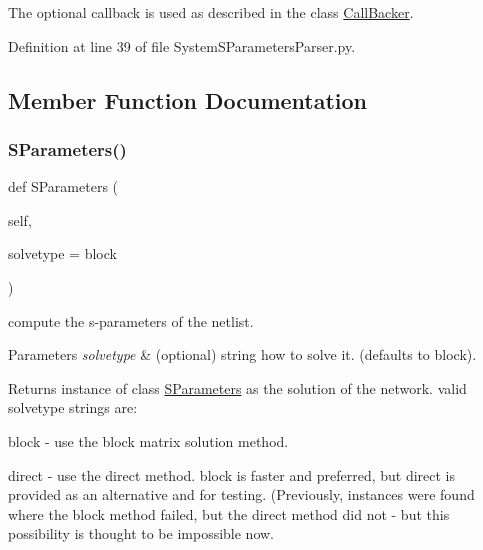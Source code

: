 The optional callback is used as described in the class \hyperlink{namespaceSignalIntegrity_1_1CallBacker}{Call\+Backer}. 

Definition at line 39 of file System\+S\+Parameters\+Parser.\+py.



\subsection{Member Function Documentation}
\mbox{\label{classSignalIntegrity_1_1Parsers_1_1SystemSParametersParser_1_1SystemSParametersNumericParser_a8d7c0357cfcdfd41f8cca9627ff9a61f}} 
\subsubsection{\texorpdfstring{S\+Parameters()}{SParameters()}}
{\footnotesize\ttfamily def S\+Parameters (\begin{DoxyParamCaption}\item[{}]{self,  }\item[{}]{solvetype = {\ttfamily \textquotesingle{}block\textquotesingle{}} }\end{DoxyParamCaption})}



compute the s-\/parameters of the netlist. 


\begin{DoxyParams}{Parameters}
{\em solvetype} & (optional) string how to solve it. (defaults to \textquotesingle{}block\textquotesingle{}). \\
\hline
\end{DoxyParams}
\begin{DoxyReturn}{Returns}
instance of class \hyperlink{namespaceSignalIntegrity_1_1SParameters}{S\+Parameters} as the solution of the network. valid solvetype strings are\+:
\begin{DoxyItemize}
\item \textquotesingle{}block\textquotesingle{} -\/ use the block matrix solution method.
\item \textquotesingle{}direct\textquotesingle{} -\/ use the direct method. \textquotesingle{}block\textquotesingle{} is faster and preferred, but direct is provided as an alternative and for testing. (Previously, instances were found where the block method failed, but the direct method did not -\/ but this possibility is thought to be impossible now. 
\end{DoxyItemize}
\end{DoxyReturn}


